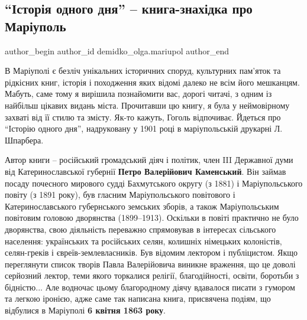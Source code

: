  
 
 
 
 
 
\subsection{\enquote{Історія одного дня} – книга-знахідка про Маріуполь}
\label{sec:04_03_2020.stz.news.ua.mrpl_city.1.knyga_istoria_odnogo_dnja}
 
\ifcmt
 author_begin
   author_id demidko_olga.mariupol
 author_end
\fi


В Маріуполі є безліч унікальних історичних споруд, культурних пам'яток та
рідкісних книг, історія і походження яких відомі далеко не всім його мешканцям.
Мабуть, саме тому я вирішила познайомити вас, дорогі читачі, з одним із
найбільш цікавих видань міста. Прочитавши цю книгу, я була у неймовірному
захваті від її стилю та змісту. Як-то кажуть, Гоголь відпочиває. Йдеться про
\enquote{Історію одного дня}, надруковану у 1901 році в маріупольській друкарні Л.
Шпарбера.

Автор книги – російський громадський діяч і політик, член III Державної думи
від Катеринославської губернії \textbf{Петро Валерійович Каменський}. Він займав посаду
почесного мирового судді Бахмутського округу (з 1881) і Маріупольського повіту
(з 1891 року), був гласним Маріупольського повітового і Катеринославського
губернського земських зборів, а також Маріупольським повітовим головою
дворянства (1899–1913). Оскільки в повіті практично не було дворянства, свою
діяльність переважно спрямовував в інтересах сільського населення: українських
та російських селян, колишніх німецьких колоністів, селян-греків і
євреїв-землевласників. Був відомим лектором і публіцистом. Якщо переглянути
список творів Павла Валерійовича виникне враження, що це доволі серйозний
лектор, теми якого торкалися релігії, благодійності, освіти, боротьби з
бідністю... Але водночас цьому благородному діячу вдавалося писати з гумором та
легкою іронією, адже саме так написана книга, присвячена подіям, що відбулися в
Маріуполі \textbf{6 квітня 1863 року}.


